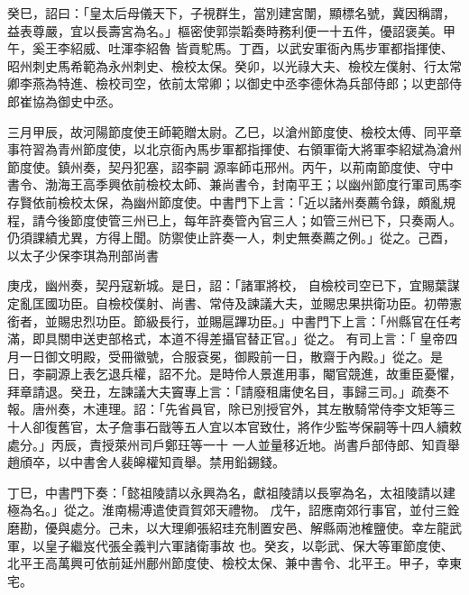 \begin{pinyinscope}
 癸巳，詔曰：「皇太后母儀天下，子視群生，當別建宮闈，顯標名號，冀因稱謂，益表尊嚴，宜以長壽宮為名。」樞密使郭崇韜奏時務利便一十五件，優詔褒美。甲午，奚王李紹威、吐渾李紹魯
 皆貢駝馬。丁酉，以武安軍衙內馬步軍都指揮使、昭州刺史馬希範為永州刺史、檢校太保。癸卯，以光祿大夫、檢校左僕射、行太常卿李燕為特進、檢校司空，依前太常卿；以御史中丞李德休為兵部侍郎；以吏部侍郎崔協為御史中丞。



 三月甲辰，故河陽節度使王師範贈太尉。乙巳，以滄州節度使、檢校太傅、同平章事符習為青州節度使，以北京衙內馬步軍都指揮使、右領軍衛大將軍李紹斌為滄州節度使。鎮州奏，契丹犯塞，詔李嗣
 源率師屯邢州。丙午，以荊南節度使、守中書令、渤海王高季興依前檢校太師、兼尚書令，封南平王；以幽州節度行軍司馬李存賢依前檢校太保，為幽州節度使。中書門下上言：「近以諸州奏薦令錄，頗亂規程，請今後節度使管三州已上，每年許奏管內官三人；如管三州已下，只奏兩人。仍須課績尤異，方得上聞。防禦使止許奏一人，刺史無奏薦之例。」從之。己酉，以太子少保李琪為刑部尚書


庚戌，幽州奏，契丹寇新城。是日，詔：「諸軍將校，
 自檢校司空已下，宜賜葉謀定亂匡國功臣。自檢校僕射、尚書、常侍及諫議大夫，並賜忠果拱衛功臣。初帶憲銜者，並賜忠烈功臣。節級長行，並賜扈蹕功臣。」中書門下上言：「州縣官在任考滿，即具關申送吏部格式，本道不得差攝官替正官。」從之。
 有司上言：「
 皇帝四月一日御文明殿，受冊徽號，合服袞冕，御殿前一日，散齋于內殿。」從之。是日，李嗣源上表乞退兵權，詔不允。是時伶人景進用事，閹官競進，故重臣憂懼，拜章請退。癸丑，左諫議大夫竇專上言：「請廢租庸使名目，事歸三司。」疏奏不報。唐州奏，木連理。詔：「先省員官，除已別授官外，其左散騎常侍李文矩等三十人卻復舊官，太子詹事石戩等五人宜以本官致仕，將作少監岑保嗣等十四人續敕處分。」丙辰，責授萊州司戶鄭玨等一十
 一人並量移近地。尚書戶部侍郎、知貢舉趙頎卒，以中書舍人裴皞權知貢舉。禁用鉛錫錢。


丁巳，中書門下奏：「懿祖陵請以永興為名，獻祖陵請以長寧為名，太祖陵請以建極為名。」從之。淮南楊溥遣使貢賀郊天禮物。
 戊午，詔應南郊行事官，並付三銓磨勘，優與處分。己未，以大理卿張紹珪充制置安邑、解縣兩池榷鹽使。幸左龍武軍，以皇子繼岌代張全義判六軍諸衛事故
 也。癸亥，以彰武、保大等軍節度使、北平王高萬興可依前延州鄜州節度使、檢校太保、兼中書令、北平王。甲子，幸東宅。




\end{pinyinscope}
